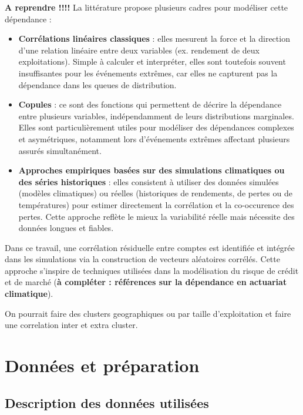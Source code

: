 \documentclass[11pt,a4paper,openright,twoside]{report}
\begin{document}
\textbf{A reprendre !!!!}
La littérature propose plusieurs cadres pour modéliser cette dépendance :  
\begin{itemize}
    \item \textbf{Corrélations linéaires classiques} : elles mesurent la force et la direction d'une relation linéaire entre deux variables (ex. rendement de deux exploitations). Simple à calculer et interpréter, elles sont toutefois souvent insuffisantes pour les événements extrêmes, car elles ne capturent pas la dépendance dans les queues de distribution.
    \item \textbf{Copules} : ce sont des fonctions qui permettent de décrire la dépendance entre plusieurs variables, indépendamment de leurs distributions marginales. Elles sont particulièrement utiles pour modéliser des dépendances complexes et asymétriques, notamment lors d’événements extrêmes affectant plusieurs assurés simultanément.
    \item \textbf{Approches empiriques basées sur des simulations climatiques ou des séries historiques} : elles consistent à utiliser des données simulées (modèles climatiques) ou réelles (historiques de rendements, de pertes ou de températures) pour estimer directement la corrélation et la co-occurence des pertes. Cette approche reflète le mieux la variabilité réelle mais nécessite des données longues et fiables.
\end{itemize}

Dans ce travail, une corrélation résiduelle entre comptes est identifiée et intégrée dans les simulations via la construction de vecteurs aléatoires corrélés. Cette approche s’inspire de techniques utilisées dans la modélisation du risque de crédit et de marché (\textbf{à compléter : références sur la dépendance en actuariat climatique}).  

On pourrait faire des clusters geographiques ou par taille d'exploitation et faire une correlation inter et extra cluster.


\chapter{Données et préparation}

\section{Description des données utilisées}
\end{document}
